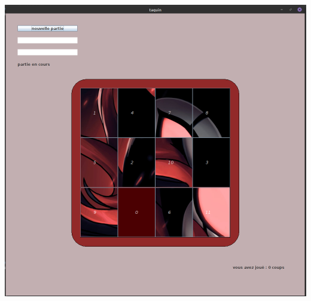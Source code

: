 \documentclass[12pt]{article}
\begin{document}
\begin{itemize}
\begin{center}
\includegraphics[scale=0.15]{images/Graph.png}
\end{center}

\end{itemize}
\vspace{10pt}
\end{document}
